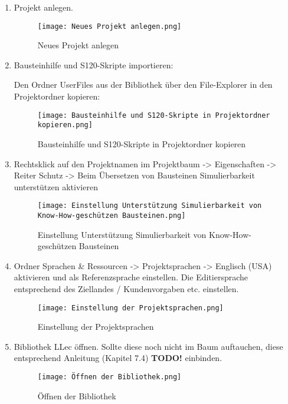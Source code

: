 \begin{enumerate}
    \item Projekt anlegen.
    \begin{figure}[!ht]
        \centering
        \texttt{[image: Neues Projekt anlegen.png]}
        \caption{Neues Projekt anlegen}
        \label{fig:Neues Projekt anlegen}
    \end{figure}

    \item Bausteinhilfe und S120-Skripte importieren:\par
    \noindent Den Ordner \glqq UserFiles\grqq{} aus der Bibliothek über den File-Explorer in den Projektordner kopieren:
    \begin{figure}[!ht]
        \centering
        \texttt{[image: Bausteinhilfe und S120-Skripte in Projektordner kopieren.png]}
        \caption{Bausteinhilfe und S120-Skripte in Projektordner kopieren}
        \label{fig:Bausteinhilfe und S120-Skripte in Projektordner kopieren}
    \end{figure}

    \item Rechtsklick auf den Projektnamen im Projektbaum -> Eigenschaften -> Reiter Schutz -> \glqq Beim Übersetzen von Bausteinen Simulierbarkeit unterstützen\grqq{} aktivieren
    \begin{figure}[!ht]
        \centering
        \texttt{[image: Einstellung Unterstützung Simulierbarkeit von Know-How-geschützen Bausteinen.png]}
        \caption{Einstellung Unterstützung Simulierbarkeit von Know-How-geschützen Bausteinen}
        \label{fig:Einstellung Unterstützung Simulierbarkeit von Know-How-geschützen Bausteinen}
    \end{figure}

    \item Ordner \glqq Sprachen \& Ressourcen\grqq{} -> Projektsprachen -> Englisch (USA) aktivieren und als Referenzsprache einstellen. Die Editiersprache entsprechend des Ziellandes / Kundenvorgaben etc. einstellen.
    \begin{figure}[!ht]
        \centering
        \texttt{[image: Einstellung der Projektsprachen.png]}
        \caption{Einstellung der Projektsprachen}
        \label{fig:Einstellung der Projektsprachen}
    \end{figure}
\clearpage
    \item Bibliothek LLec öffnen. Sollte diese noch nicht im Baum auftauchen, diese entsprechend Anleitung (Kapitel 7.4) \textbf{TODO!} einbinden.
    \begin{figure}[!ht]
        \centering
        \texttt{[image: Öffnen der Bibliothek.png]}
        \caption{Öffnen der Bibliothek}
        \label{fig:Öffnen der Bibliothek}
    \end{figure}


\end{enumerate}
